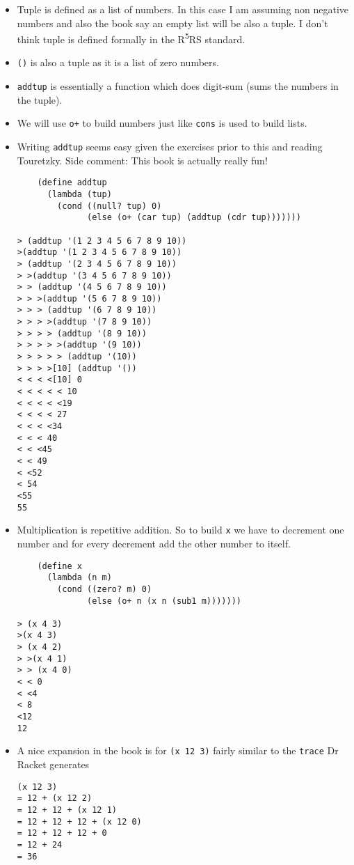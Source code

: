 \documentclass[11pt]{article}
\begin{document}
\begin{itemize}
\begin{verbatim}
> (o- 5 3)
>(o- 5 3)
> (o- 5 2)
> >(o- 5 1)
> > (o- 5 0)
< < 5
< <4
< 3
<2
2

\end{verbatim}

\item Tuple is defined as a list of numbers. In this case I am assuming non negative numbers and also the book say an empty list will be also a
tuple. I don't think tuple is defined formally in the R\textsuperscript{5}RS standard.
\item \texttt{()} is also a tuple as it is a list of zero numbers.
\item \texttt{addtup} is essentially a function which does digit-sum (sums the numbers in the tuple).
\item We will use \texttt{o+} to build numbers just like \texttt{cons} is used to build lists.
\item Writing \texttt{addtup} seems easy given the exercises prior to this and reading Touretzky. Side comment: This book is actually really fun!
\begin{verbatim}
    (define addtup
      (lambda (tup)
        (cond ((null? tup) 0)
              (else (o+ (car tup) (addtup (cdr tup)))))))

> (addtup '(1 2 3 4 5 6 7 8 9 10))
>(addtup '(1 2 3 4 5 6 7 8 9 10))
> (addtup '(2 3 4 5 6 7 8 9 10))
> >(addtup '(3 4 5 6 7 8 9 10))
> > (addtup '(4 5 6 7 8 9 10))
> > >(addtup '(5 6 7 8 9 10))
> > > (addtup '(6 7 8 9 10))
> > > >(addtup '(7 8 9 10))
> > > > (addtup '(8 9 10))
> > > > >(addtup '(9 10))
> > > > > (addtup '(10))
> > > >[10] (addtup '())
< < < <[10] 0
< < < < < 10
< < < < <19
< < < < 27
< < < <34
< < < 40
< < <45
< < 49
< <52
< 54
<55
55

\end{verbatim}

\item Multiplication is repetitive addition. So to build \texttt{x} we have to decrement one number and for every decrement add the other number to itself.
\begin{verbatim}
    (define x
      (lambda (n m)
        (cond ((zero? m) 0)
              (else (o+ n (x n (sub1 m)))))))

> (x 4 3)
>(x 4 3)
> (x 4 2)
> >(x 4 1)
> > (x 4 0)
< < 0
< <4
< 8
<12
12

\end{verbatim}

\item A nice expansion in the book is for \texttt{(x 12 3)} fairly similar to the \texttt{trace} Dr Racket generates
\begin{verbatim}
(x 12 3)
= 12 + (x 12 2)
= 12 + 12 + (x 12 1)
= 12 + 12 + 12 + (x 12 0)
= 12 + 12 + 12 + 0
= 12 + 24
= 36


\end{verbatim}
\end{itemize}
\end{document}
